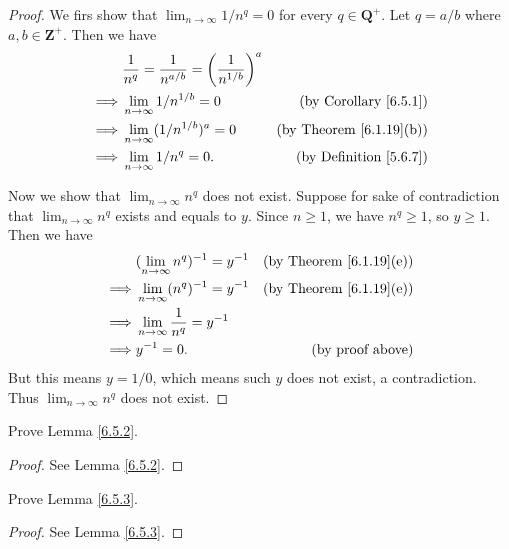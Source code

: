 \begin{proof}
    We firs show that \(\lim_{n \to \infty} 1 / n^q = 0\) for every \(q \in \mathbf{Q}^+\).
    Let \(q = a / b\) where \(a, b \in \mathbf{Z}^+\).
    Then we have
    \begin{align*}
                 & \frac{1}{n^q} = \frac{1}{n^{a / b}} = \bigg(\frac{1}{n^{1 / b}}\bigg)^a                                       \\
        \implies & \lim_{n \to \infty} 1 / n^{1 / b} = 0                                   & \text{(by Corollary \ref{6.5.1})}   \\
        \implies & \lim_{n \to \infty} (1 / n^{1 / b})^a = 0                               & \text{(by Theorem \ref{6.1.19}(b))} \\
        \implies & \lim_{n \to \infty} 1 / n^q = 0.                                        & \text{(by Definition \ref{5.6.7})}
    \end{align*}

    Now we show that \(\lim_{n \to \infty} n^q\) does not exist.
    Suppose for sake of contradiction that \(\lim_{n \to \infty} n^q\) exists and equals to \(y\).
    Since \(n \geq 1\), we have \(n^q \geq 1\), so \(y \geq 1\).
    Then we have
    \begin{align*}
                 & (\lim_{n \to \infty} n^q)^{-1} = y^{-1}    & \text{(by Theorem \ref{6.1.19}(e))} \\
        \implies & \lim_{n \to \infty} (n^q)^{-1} = y^{-1}    & \text{(by Theorem \ref{6.1.19}(e))} \\
        \implies & \lim_{n \to \infty} \frac{1}{n^q} = y^{-1}                                       \\
        \implies & y^{-1} = 0.                                & \text{(by proof above)}
    \end{align*}
    But this means \(y = 1 / 0\), which means such \(y\) does not exist, a contradiction.
    Thus \(\lim_{n \to \infty} n^q\) does not exist.
\end{proof}

\begin{exercise}\label{ex 6.5.2}
    Prove Lemma \ref{6.5.2}.
\end{exercise}

\begin{proof}
    See Lemma \ref{6.5.2}.
\end{proof}

\begin{exercise}\label{ex 6.5.3}
    Prove Lemma \ref{6.5.3}.
\end{exercise}

\begin{proof}
    See Lemma \ref{6.5.3}.
\end{proof}
